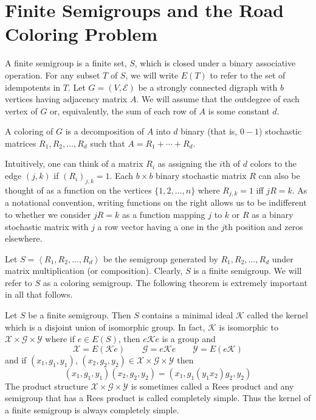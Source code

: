 

\section{Finite Semigroups and the Road Coloring Problem}  
\label{sec:4.2}


A finite semigroup is a finite set, $S$, which is closed under a binary associative operation. 
For any subset $T$ of $S$, we will write $E(T)$ to refer to the set of idempotents in $T$. 
Let $G=(V,\mathcal{E})$ be a strongly connected digraph with $b$ vertices having adjacency matrix $A$. 
We will assume that the outdegree of each vertex of $G$ or, equivalently, the sum of each  row of $A$ is some constant $d$.

\begin{definition}	\label{organized:coloring-semigroup-definition}
A coloring of $G$ is a decomposition of $A$ into $d$ binary (that is, $0-1$)
stochastic matrices $R_1,R_2,\dots,R_d$ such
that $A=R_1+\cdots+R_d$.

\vphantom{...}

Intuitively, one can think of a matrix $R_i$ as assigning the $i$th of $d$
colors to the edge $(j,k)$ if $(R_i)_{j,k}=1$. Each 
$b\times b$ binary stochastic matrix $R$ can also be thought of as a
function on the vertices $\{1,2,\dots,n\}$ where
$R_{j,k}=1$ iff $jR=k$. As a notational convention, writing functions on the
right allows us to be indifferent to whether we
consider $jR=k$ as a function mapping $j$ to $k$ or $R$ as a binary
stochastic matrix with $j$ a row vector having a one in 
the $j$th position and zeros elsewhere. 

Let $S=\left\langle R_1,R_2,\dots, R_d\right\rangle$ be the semigroup
generated by $R_1,R_2,\dots,R_d$ under 
matrix multiplication (or composition). Clearly, $S$ is a finite semigroup.
We will refer to $S$ as a coloring semigroup. The
following theorem is extremely important in all that follows. 
\end{definition}

\begin{theorem}[\cite{CP}]	\label{thm:4.1} 
Let $S$ be a finite semigroup. Then $S$ contains a minimal ideal $\mathcal{K}$
called the kernel which is a disjoint union of
isomorphic group. In fact, $\mathcal{K}$ is isomorphic to $\mathcal{X} \times \mathcal{G}  \times \mathcal{Y}$ where if $e\in E(S)$, then
$e\mathcal{K}e$ is a group and
\[
\mathcal{X} = E( \mathcal{K}e)\qquad  \mathcal{G} = e\mathcal{K}e \qquad  \mathcal{Y} = E(e\mathcal{K}
)
\]
and if $\left( x_1,g_1,y_1\right) $, $\left( x_2,g_2,y_2\right)  \in \mathcal{X} \times \mathcal{G} \times \mathcal{Y}$
then 
\[
(x_1, g_1, y_1) (x_2, g_2, y_2) = (x_1, g_1( y_1x_2) g_2, y_2)
\]
The product structure $\mathcal{X} \times \mathcal{G} \times \mathcal{Y}$ is sometimes called a Rees product and any semigroup that has 
a Rees product is called completely simple. 
Thus the kernel of a finite semigroup is always completely simple.
\end{theorem}

